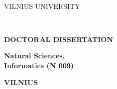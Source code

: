 \thispagestyle{empty}                   %
{\selectfont
\linespread{1.15}\selectfont
\renewcommand\bfdefault{m}%

\begin{flushright}
    \thesisDOI \\
    \thesisORCID
\end{flushright}

\begin{center}
	\vspace*{5mm}	
	\begin{flushleft}
         \fontsize{12}{12}\selectfont
	       VILNIUS UNIVERSITY \\
	\end{flushleft}
 
	\vspace{50mm}
	\begin{flushleft}
	   {\fontsize{15}{15}\selectfont  \thesisAuthorName  \\ \MakeUppercase{\thesisAuthorSurname} \par}
    \end{flushleft}

	\vspace{10mm}
	\begin{flushleft}
    	{ \fontsize{21}{21}\selectfont
    	   \thesisTitleEN \par
    	}
    \end{flushleft}

    \vspace{50mm}
    \begin{flushleft}
        \renewcommand\bfdefault{b}
        \fontsize{12}{12}\selectfont
        {\bf DOCTORAL DISSERTATION}\\ 
    \end{flushleft}
    
    \vspace{5mm}
    \begin{flushleft}
        \renewcommand\bfdefault{m}
        \fontsize{12}{12}\selectfont
        \bf
            Natural Sciences, \\ %
            Informatics (N 009)  %
    \end{flushleft}
    
    \vspace{6mm}
    \begin{flushleft} 
         \fontsize{9}{9}\selectfont
        \bf VILNIUS \thesisYear
    \end{flushleft} 
\end{center}
}

